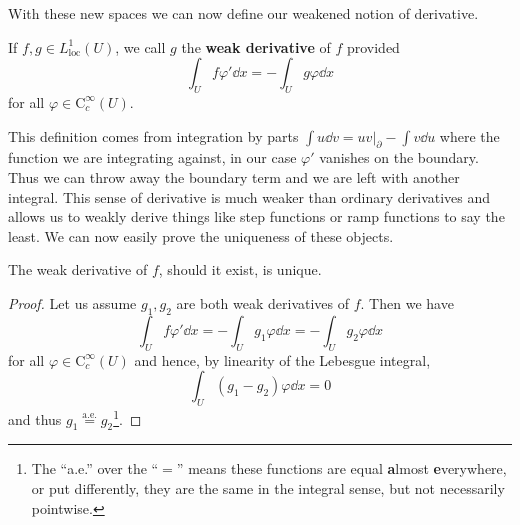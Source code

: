 With these new spaces we can now define our weakened notion of derivative.
\begin{definition}
    If \(f,g \in L^1_\mathrm{loc}(U)\), we call \(g\) the
    \textbf{weak derivative} of \(f\) provided
    \begin{equation}
        \int_U f\varphi'\dd{x} = -\int_U g\varphi\dd{x}
    \end{equation}
    for all \(\varphi\in\mathrm{C}_c^\infty(U)\).
\end{definition}
This definition comes from integration by parts \(\int u\dd{v} = uv|_\partial - \int v\dd{u}\)
where the function we are integrating against, in our case \(\varphi'\) vanishes
on the boundary. Thus we can throw away the boundary term and we are left with
another integral. This sense of derivative is much weaker than ordinary
derivatives and allows us to weakly derive things like step functions or ramp
functions to say the least. We can now easily prove the uniqueness of these
objects.
\begin{lemma}
    The weak derivative of \(f\), should it exist, is unique.
\end{lemma}
\begin{proof}
    Let us assume \(g_1, g_2\) are both weak derivatives of \(f\). Then we have
    \begin{equation}
        \int_U f\varphi'\dd{x} = -\int_U g_1\varphi\dd{x} = -\int_U g_2\varphi\dd{x}
    \end{equation}
    for all \(\varphi\in \mathrm{C}_c^\infty(U)\) and hence, by linearity of the
    Lebesgue integral,
    \begin{equation}
        \int_U\left(g_1 - g_2\right)\varphi\dd{x} = 0
    \end{equation}
    and thus \(g_1\overset{\text{a.e.}}{=}g_2\)\footnote{The ``a.e.'' over the
    ``\(=\)'' means these functions are equal \textbf{a}lmost
    \textbf{e}verywhere, or put differently, they are the same in the integral
    sense, but not necessarily pointwise.}.
\end{proof}

